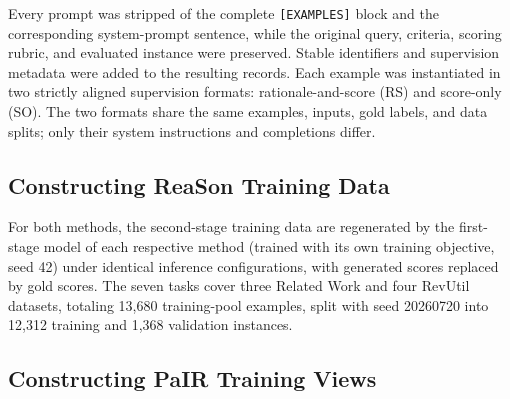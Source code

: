 Every prompt was stripped of the complete \texttt{[EXAMPLES]} block and the
corresponding system-prompt sentence, while the original query, criteria,
scoring rubric, and evaluated instance were preserved. Stable identifiers and
supervision metadata were added to the resulting records. Each example was 
instantiated in two strictly aligned supervision formats:
rationale-and-score (RS) and score-only (SO). The two formats share the same
examples, inputs, gold labels, and data splits; only their system instructions
and completions differ.


\subsection{Constructing ReaSon Training Data}
\label{tab:constructing-reason-data}


For both methods, the second-stage training data are regenerated by the
first-stage model of each respective method (trained with its own training
objective, seed 42) under identical inference configurations, with generated
scores replaced by gold scores. The seven tasks cover three Related Work and
four RevUtil datasets, totaling 13,680 training-pool examples, split with
seed 20260720 into 12,312 training and 1,368 validation instances.

\subsection{Constructing PaIR Training Views}
\label{tab:constructing-pair-data}


